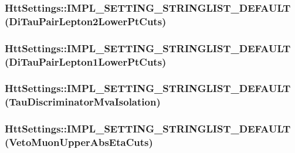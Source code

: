 \label{classHttSettings_ad6b4742eaea19aeabc3ddcf31b69606f}
\hypertarget{classHttSettings_ac90837d592db267590fd1587b8189b94}{
\subsubsection[{IMPL\_\-SETTING\_\-STRINGLIST\_\-DEFAULT}]{\setlength{\rightskip}{0pt plus 5cm}HttSettings::IMPL\_\-SETTING\_\-STRINGLIST\_\-DEFAULT (DiTauPairLepton2LowerPtCuts)}}
\label{classHttSettings_ac90837d592db267590fd1587b8189b94}
\hypertarget{classHttSettings_a5dc15345059d488018fdadd26c298f24}{
\subsubsection[{IMPL\_\-SETTING\_\-STRINGLIST\_\-DEFAULT}]{\setlength{\rightskip}{0pt plus 5cm}HttSettings::IMPL\_\-SETTING\_\-STRINGLIST\_\-DEFAULT (DiTauPairLepton1LowerPtCuts)}}
\label{classHttSettings_a5dc15345059d488018fdadd26c298f24}
\hypertarget{classHttSettings_a369684e978992824030fcba3051c8792}{
\subsubsection[{IMPL\_\-SETTING\_\-STRINGLIST\_\-DEFAULT}]{\setlength{\rightskip}{0pt plus 5cm}HttSettings::IMPL\_\-SETTING\_\-STRINGLIST\_\-DEFAULT (TauDiscriminatorMvaIsolation)}}
\label{classHttSettings_a369684e978992824030fcba3051c8792}
\hypertarget{classHttSettings_a8b698b24a00bf7a7d9f7cba39c21458b}{
\subsubsection[{IMPL\_\-SETTING\_\-STRINGLIST\_\-DEFAULT}]{\setlength{\rightskip}{0pt plus 5cm}HttSettings::IMPL\_\-SETTING\_\-STRINGLIST\_\-DEFAULT (VetoMuonUpperAbsEtaCuts)}}

